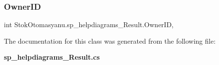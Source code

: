 \subsubsection{Owner\+ID}
{\footnotesize\ttfamily int Stok\+Otomasyanu.\+sp\+\_\+helpdiagrams\+\_\+\+Result.\+Owner\+ID\hspace{0.3cm}{\ttfamily [get]}, {\ttfamily [set]}}



The documentation for this class was generated from the following file\+:\begin{DoxyCompactItemize}
\item 
\textbf{ sp\+\_\+helpdiagrams\+\_\+\+Result.\+cs}\end{DoxyCompactItemize}

